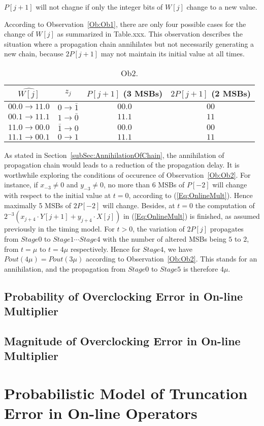 \documentclass[a4paper, 11pt]{article}
\newtheorem{Ob}{\hskip\parindent\bf{Observation}}[]
\begin{document}
\begin{Ob}\label{Ob:Ob2}
    $P[j+1]$ will not chagne if only the integer bits of $W[j]$ change to a new value.
\end{Ob}

According to Observation~\ref{Ob:Ob1}, there are only four possible cases for the change of $W[j]$ as summarized in Table.xxx. This observation describes the situation where a propagation chain annihilates but not necessarily generating a new chain, because $2P[j+1]$ may not maintain its initial value at all times.
%
\begin{table}[htbp]
\caption{Ob2.}
\centering
\begin{tabular}{c|ccc}
\toprule
 $\widehat{W[j]}$ & $z_j$ & $P[j+1]$ (3 MSBs)  & $2P[j+1]$ (2 MSBs) \\ \midrule
 $00.0\rightarrow11.0$ & $0\rightarrow\bar{1}$ & $00.0$ & $00$\\
 $00.1\rightarrow11.1$ & $1\rightarrow\bar{0}$ & $11.1$ & $11$\\
 $11.0\rightarrow00.0$ & $\bar{1}\rightarrow0$ & $00.0$ & $00$\\
 $11.1\rightarrow00.1$ & $0\rightarrow{1}$ & $11.1$ & $11$\\ \bottomrule
\end{tabular}
\label{Tab:Observation2}
\end{table}


As stated in Section~\ref{subSec:AnnihilationOfChain}, the annihilation of propagation chain would leads to a reduction of the propagation delay. It is worthwhile exploring the conditions of occurence of Observation~\ref{Ob:Ob2}. For instance, if $x_{-3}\neq0$ and $y_{-3}\neq0$, no more than 6 MSBs of $P[-2]$ will change with respect to the initial value at $t=0$, according to (\ref{Eq:OnlineMult}). Hence maximally 5 MSBs of $2P[-2]$ will change. Besides, at $t=0$ the computation of $2^{-3}(x_{j+4}\cdot Y[j+1]+y_{j+4}\cdot X[j])$ in (\ref{Eq:OnlineMult}) is finished, as assumed previously in the timing model. For $t>0$, the variation of $2P[j]$ propagates from $Stage0$ to $Stage1\cdots Stage4$ with the number of altered MSBs being $5$ to $2$, from $t=\mu$ to $t=4\mu$ respectively. Hence for $Stage4$, we have $Pout(4\mu)=Pout(3\mu)$ according to Observation~\ref{Ob:Ob2}. This stands for an annihilation, and the propagation from $Stage0$ to $Stage5$ is therefore $4\mu$. 

\subsection{Probability of Overclocking Error in On-line Multiplier}

\subsection{Magnitude of Overclocking Error in On-line Multiplier}

\section{Probabilistic Model of Truncation Error in On-line Operators}
\end{document}
